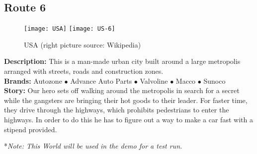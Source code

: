 \documentclass[12pt]{article}
\begin{document}
\subsection{Route 6}
\begin{figure}[h]
    \centering
    \begin{multicols}{2}
        \texttt{[image: USA]}
        \texttt{[image: US-6]}
    \end{multicols}
    \caption{USA (right picture source: Wikipedia)}
\end{figure}
\begin{addmargin}[5mm]{0em}
\textbf{Description:} This is a man-made urban city built around a large metropolis arranged with streets, roads and construction zones. \\ %
\noindent \textbf{Brands:} Autozone $\bullet$ Advance Auto Parts $\bullet$ Valvoline $\bullet$ Macco $\bullet$ Sunoco \\
\noindent \textbf{Story:} Our hero sets off walking around the metropolis in search for a secret while the gangsters are bringing their hot goods to their leader. For faster time, they drive through the highways, which prohibits pedestrians to enter the highways. In order to do this he has to figure out a way to make a car fast with a stipend provided.
\end{addmargin}
*\textit{Note: This World will be used in the demo for a test run.}
\end{document}
